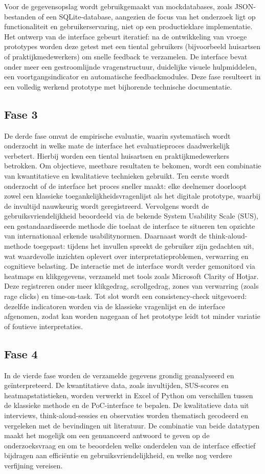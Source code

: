 Voor de gegevensopslag wordt gebruikgemaakt van mockdatabases, zoals JSON-bestanden of een SQLite-database, aangezien de focus van het onderzoek ligt op functionaliteit en gebruikerservaring, niet op een productieklare implementatie.
Het ontwerp van de interface gebeurt iteratief: na de ontwikkeling van vroege prototypes worden deze getest met een tiental gebruikers (bijvoorbeeld huisartsen of praktijkmedewerkers) om snelle feedback te verzamelen.
De interface bevat onder meer een gestroomlijnde vragenstructuur, duidelijke visuele hulpmiddelen, een voortgangsindicator en automatische feedbackmodules.
Deze fase resulteert in een volledig werkend prototype met bijhorende technische documentatie.
\subsection{Fase 3}
\label{ter:Fase 3}
De derde fase omvat de empirische evaluatie, waarin systematisch wordt onderzocht in welke mate de interface het evaluatieproces daadwerkelijk verbetert.
Hierbij worden een tiental huisartsen en praktijkmedewerkers betrokken.
Om objectieve, meetbare resultaten te bekomen, wordt een combinatie van kwantitatieve en kwalitatieve technieken gebruikt.
Ten eerste wordt onderzocht of de interface het proces sneller maakt: elke deelnemer doorloopt zowel een klassieke toegankelijkheidsvragenlijst als het digitale prototype, waarbij de invultijd nauwkeurig wordt geregistreerd.
Vervolgens wordt de gebruiksvriendelijkheid beoordeeld via de bekende System Usability Scale (SUS), een gestandaardiseerde methode die toelaat de interface te situeren ten opzichte van internationaal erkende usabilitynormen.
Daarnaast wordt de think-aloud-methode toegepast: tijdens het invullen spreekt de gebruiker zijn gedachten uit, wat waardevolle inzichten oplevert over interpretatieproblemen, verwarring en cognitieve belasting.
De interactie met de interface wordt verder gemonitord via heatmaps en klikgegevens, verzameld met tools zoals Microsoft Clarity of Hotjar.
Deze registreren onder meer klikgedrag, scrollgedrag, zones van verwarring (zoals rage clicks) en time-on-task.
Tot slot wordt een consistency-check uitgevoerd: dezelfde indicatoren worden via de klassieke vragenlijst en de interface afgenomen, zodat kan worden nagegaan of het prototype leidt tot minder variatie of foutieve interpretaties.
\subsection{Fase 4}
\label{ter:Fase 4}
In de vierde fase worden de verzamelde gegevens grondig geanalyseerd en geïnterpreteerd.
De kwantitatieve data, zoals invultijden, SUS-scores en heatmapstatistieken, worden verwerkt in Excel of Python om verschillen tussen de klassieke methode en de PoC-interface te bepalen.
De kwalitatieve data uit interviews, think-aloud-sessies en observaties worden thematisch gecodeerd en vergeleken met de bevindingen uit literatuur.
De combinatie van beide datatypen maakt het mogelijk om een genuanceerd antwoord te geven op de onderzoeksvraag en om te beoordelen welke onderdelen van de interface effectief bijdragen aan efficiëntie en gebruiksvriendelijkheid, en welke nog verdere verfijning vereisen.

